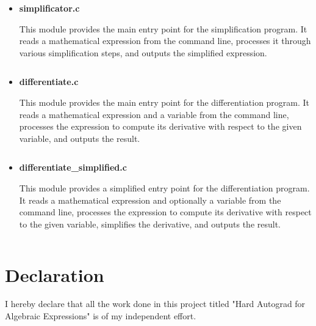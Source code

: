 \documentclass{report}
\begin{document}
\begin{itemize}
\begin{itemize}
        \item \textbf{simplificator.c}
        
        This module provides the main entry point for the simplification program. It reads a mathematical expression from the command line, processes it through various simplification steps, and outputs the simplified expression.
        \inputminted{c}{../code/simplificator.c}

        \item \textbf{differentiate.c}
        
        This module provides the main entry point for the differentiation program. It reads a mathematical expression and a variable from the command line, processes the expression to compute its derivative with respect to the given variable, and outputs the result.
        \inputminted{c}{../code/differentiate.c}

        \item \textbf{differentiate\_simplified.c}
        
        This module provides a simplified entry point for the differentiation program. It reads a mathematical expression and optionally a variable from the command line, processes the expression to compute its derivative with respect to the given variable, simplifies the derivative, and outputs the result.
        \inputminted{c}{../code/differentiate_simplified.c}
    \end{itemize}
\end{itemize}


\chapter*{Declaration}
I hereby declare that all the work done in this project titled "Hard Autograd for Algebraic Expressions" is of my independent effort.
\end{document}
